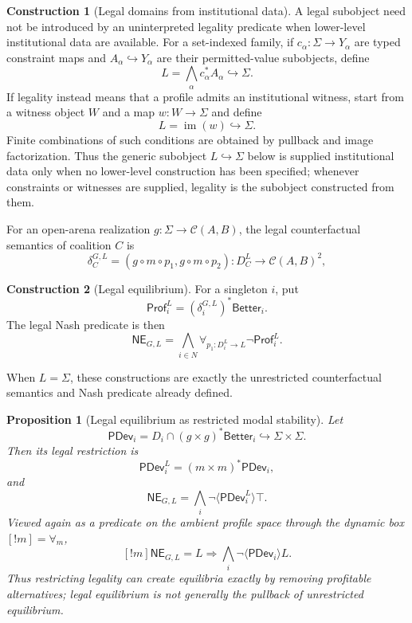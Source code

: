 \documentclass[11pt,a4paper]{article}
\numberwithin{equation}{section}
\newtheorem{proposition}[theorem]{Proposition}
\theoremstyle{definition}
\newtheorem{construction}[construction]{Construction}
\theoremstyle{remark}
\theoremstyle{plain}
\begin{document}
\begin{construction}[Legal domains from institutional data]
\label{con:egt-legal-domain}
A legal subobject need not be introduced by an uninterpreted legality
predicate when lower-level institutional data are available. For a set-indexed
family, if $c_\alpha:\Sigma\to Y_\alpha$ are typed constraint maps and
$A_\alpha\hookrightarrow Y_\alpha$ are their permitted-value subobjects,
define
\[
 L=\bigwedge_\alpha c_\alpha^*A_\alpha
 \hookrightarrow\Sigma.
\]
If legality instead means that a profile admits an institutional witness,
start from a witness object $W$ and a map $w:W\to\Sigma$ and define
\[
 L=\operatorname{im}(w)\hookrightarrow\Sigma.
\]
Finite combinations of such conditions are obtained by pullback and image
factorization. Thus the generic subobject $L\hookrightarrow\Sigma$ below is
supplied institutional data only when no lower-level construction has been
specified; whenever constraints or witnesses are supplied, legality is the
subobject constructed from them.
\end{construction}

For an open-arena realization $g:\Sigma\to\mathcal C(A,B)$, the legal
counterfactual semantics of coalition $C$ is
\begin{equation}
\label{eq:egt-legal-counterfactual}
 \delta_C^{G,L}
 =(g\circ m\circ p_1,g\circ m\circ p_2):
 D_C^L\longrightarrow\mathcal C(A,B)^2,
\end{equation}
\begin{construction}[Legal equilibrium]
For a singleton $i$, put
\[
 \mathsf{Prof}_i^L
 =(\delta_i^{G,L})^*\mathsf{Better}_i.
\]
The legal Nash predicate is then
\begin{equation}
\label{eq:egt-legal-ne}
 \mathsf{NE}_{G,L}
 =\bigwedge_{i\in N}
   \forall_{p_1:D_i^L\to L}\neg\mathsf{Prof}_i^L.
\end{equation}
\end{construction}

When $L=\Sigma$, these constructions are exactly the unrestricted
counterfactual semantics and Nash predicate already defined.

\begin{proposition}[Legal equilibrium as restricted modal stability]
\label{prop:egt-legal-ne-modal}
Let
\[
 \mathsf{PDev}_i
 =D_i\cap(g\times g)^*\mathsf{Better}_i
 \hookrightarrow\Sigma\times\Sigma.
\]
Then its legal restriction is
\[
 \mathsf{PDev}_i^L=(m\times m)^*\mathsf{PDev}_i,
\]
and
\begin{equation}
\label{eq:egt-legal-ne-modal}
 \mathsf{NE}_{G,L}
 =\bigwedge_i\neg\langle\mathsf{PDev}_i^L\rangle\top.
\end{equation}
Viewed again as a predicate on the ambient profile space through the dynamic
box $[!m]=\forall_m$,
\begin{equation}
\label{eq:egt-legal-ne-ambient-reduction}
 [!m]\mathsf{NE}_{G,L}
 =L\Rightarrow
   \bigwedge_i\neg\langle\mathsf{PDev}_i\rangle L.
\end{equation}
Thus restricting legality can create equilibria exactly by removing
profitable alternatives; legal equilibrium is not generally the pullback of
unrestricted equilibrium.
\end{proposition}
\end{document}
